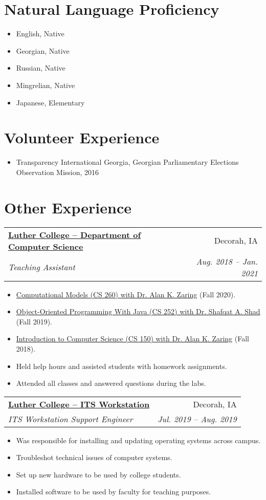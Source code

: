 \documentclass{article}
\makeatletter
\newcommand{\entry}[4]{
    \vspace{-1pt}
    \item
    \begin{tabular*}{0.98\textwidth}[t]{l@{\extracolsep{\fill}}r}
        \textbf{#1} & #2\\
        \textit{\small#3} & \textit{\small #4}\\
    \end{tabular*}\vspace{-4pt}
}
\newcommand{\entriesbegin}{\begin{itemize}[leftmargin=*]}
\newcommand{\entriesend}{\end{itemize}}
\newcommand{\entryitemsstart}{\begin{itemize}[label=\(\circ\)]}
\newcommand{\entryitemsend}{\end{itemize}\vspace{-4pt}}
\newcommand{\entryitem}[1]{\item\small{#1}}
\newcommand{\entrysubitem}[1]{\item[\(\circ\)]\small{#1}\vspace{-4pt}}
\makeatother
\begin{document}


\section{Natural Language Proficiency}

\entriesbegin
\entrysubitem{English, Native}
\entrysubitem{Georgian, Native}
\entrysubitem{Russian, Native}
\entrysubitem{Mingrelian, Native}
\entrysubitem{Japanese, Elementary}
\entriesend



\section{Volunteer Experience}

\entriesbegin
\entrysubitem{Transparency International Georgia, Georgian Parliamentary Elections Observation Mission, 2016}
\entriesend



\section{Other Experience}

\entry{\href{https://www.luther.edu/}{Luther College -- Department of Computer Science}}{Decorah, IA}{Teaching Assistant}{Aug. 2018 -- Jan. 2021}
\entryitemsstart
    \entryitem{\href{https://www.luther.edu/catalog/curriculum/computer-science/}{Computational Models (CS 260) with Dr. Alan K. Zaring} (Fall 2020).}
    \entryitem{\href{https://www.luther.edu/catalog/curriculum/computer-science/}{Object-Oriented Programming With Java (CS 252) with Dr. Shafqat A. Shad} (Fall 2019).}
    \entryitem{\href{https://www.luther.edu/catalog/curriculum/computer-science/}{Introduction to Computer Science (CS 150) with Dr. Alan K. Zaring} (Fall 2018).}
    \entryitem{Held help hours and assisted students with homework assignments.}
    \entryitem{Attended all classes and answered questions during the labs.}
\entryitemsend

\entry{\href{https://www.luther.edu/its/}{Luther College -- ITS Workstation}}{Decorah, IA}{ITS Workstation Support Engineer}{Jul. 2019 -- Aug. 2019}
\entryitemsstart
    \entryitem{Was responsible for installing and updating operating systems across campus.}
    \entryitem{Troubleshot technical issues of computer systems.}
    \entryitem{Set up new hardware to be used by college students.}
    \entryitem{Installed software to be used by faculty for teaching purposes.}
\entryitemsend
\end{document}

